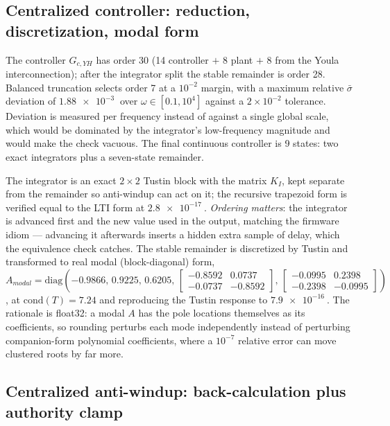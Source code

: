 \documentclass[energies,article,submit,pdftex,oneauthor]{Definitions/mdpi}
\begin{document}
\subsection{Centralized controller: reduction, discretization, modal form}

The controller $G_{c,YH}$ has order 30 (14 controller $+$ 8 plant $+$ 8 from the Youla
interconnection); after the integrator split the stable remainder is order 28. Balanced truncation
selects order 7 at a $10^{-2}$ margin, with a maximum relative $\bar\sigma$ deviation of
$\SI{1.88e-3}{}$ over $\omega\in[0.1, 10^4]$ against a $2\times10^{-2}$ tolerance. Deviation is
measured per frequency instead of against a single global scale, which would be dominated by the
integrator's low-frequency magnitude and would make the check vacuous. The final continuous
controller is 9 states: two exact integrators plus a seven-state remainder.

The integrator is an exact $2\times2$ Tustin block with the matrix $K_I$, kept separate from the
remainder so anti-windup can act on it; the recursive trapezoid form is verified equal to the LTI
form at $\SI{2.8e-17}{}$. \emph{Ordering matters}: the integrator is advanced first and the new
value used in the output, matching the firmware idiom --- advancing it afterwards inserts a hidden
extra sample of delay, which the equivalence check catches. The stable remainder is discretized by
Tustin and transformed to real modal (block-diagonal) form,
$A_{modal} = \mathrm{diag}(-0.9866,\,0.9225,\,0.6205,\,
\left[\begin{smallmatrix}-0.8592 & 0.0737\\ -0.0737 & -0.8592\end{smallmatrix}\right],\,
\left[\begin{smallmatrix}-0.0995 & 0.2398\\ -0.2398 & -0.0995\end{smallmatrix}\right])$,
at $\mathrm{cond}(T) = 7.24$ and reproducing the Tustin response to $\SI{7.9e-16}{}$. The
rationale is float32: a modal $A$ has the pole locations themselves as its coefficients, so
rounding perturbs each mode independently instead of perturbing companion-form polynomial
coefficients, where a $10^{-7}$ relative error can move clustered roots by far more.

\subsection{Centralized anti-windup: back-calculation plus authority clamp}
\end{document}
